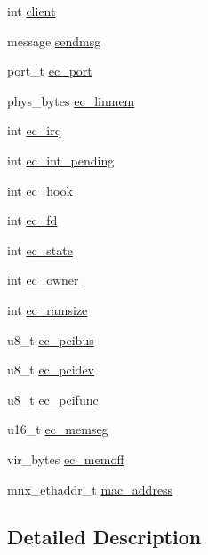\begin{DoxyCompactItemize}
\item 
int \hyperlink{structeth__card_a4bf947cca001e8ca0cd9def2b8d058c7}{client}
\item 
message \hyperlink{structeth__card_aa5eddbd0b3cb93e6d3b798241bbafb35}{sendmsg}
\item 
port\+\_\+t \hyperlink{structeth__card_a640f91748f3db96c4445ddc3ec0a60e2}{ec\+\_\+port}
\item 
phys\+\_\+bytes \hyperlink{structeth__card_af9f342fc73490342cbb6c3b75c316817}{ec\+\_\+linmem}
\item 
int \hyperlink{structeth__card_a0e86266e3a1ed0a4cabaf2bbe8e6fb10}{ec\+\_\+irq}
\item 
int \hyperlink{structeth__card_a8ad1572edf76bc1a36efce44d02998c7}{ec\+\_\+int\+\_\+pending}
\item 
int \hyperlink{structeth__card_a32bb72dc9332542f9924c1b5742d5f75}{ec\+\_\+hook}
\item 
int \hyperlink{structeth__card_abe4828b25f36af9f6d8dcf2a71507243}{ec\+\_\+fd}
\item 
int \hyperlink{structeth__card_a227ab41e0bca9197ff22eca88f17e610}{ec\+\_\+state}
\item 
int \hyperlink{structeth__card_a2c5b20aea6d29454bd362a2defe6d88e}{ec\+\_\+owner}
\item 
int \hyperlink{structeth__card_af026fee192bff1a9d3c08b9bae5753da}{ec\+\_\+ramsize}
\item 
u8\+\_\+t \hyperlink{structeth__card_ad90ce637514b7f6a3542d3d86c66f508}{ec\+\_\+pcibus}
\item 
u8\+\_\+t \hyperlink{structeth__card_abf4406307f3957e03a1f0d696b4c4a0f}{ec\+\_\+pcidev}
\item 
u8\+\_\+t \hyperlink{structeth__card_a6421c01a6ff80f52f9f1a6034fd145fe}{ec\+\_\+pcifunc}
\item 
u16\+\_\+t \hyperlink{structeth__card_a818ef13572152bb76eb0465686d83843}{ec\+\_\+memseg}
\item 
vir\+\_\+bytes \hyperlink{structeth__card_a7f0dbfd00ec4c177be3074c802e61244}{ec\+\_\+memoff}
\item 
mnx\+\_\+ethaddr\+\_\+t \hyperlink{structeth__card_a7952778279f16f37cc6ecfd2c812ae5d}{mac\+\_\+address}
\end{DoxyCompactItemize}


\subsection{Detailed Description}



